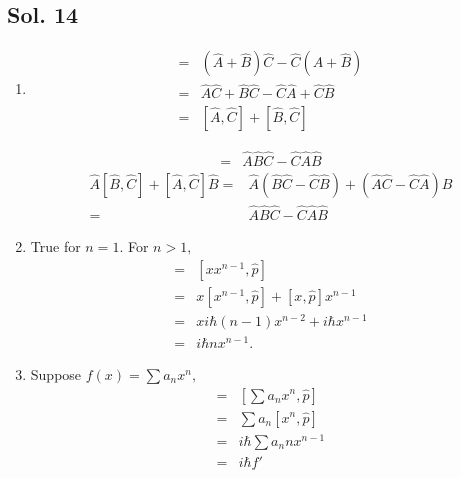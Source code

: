 \subsection*{Sol. 14}
\begin{enumerate}
    \item 
    \begin{align*}
        [\hat{A}+\hat{B}, \hat{C}]
        = &(\hat{A}+\hat{B})\hat{C}-\hat{C}(\hat{A}+\hat{B})\\
        =&\hat{A}\hat{C}+\hat{B}\hat{C}-\hat{C}\hat{A}+\hat{C}\hat{B}\\
        =&[\hat{A},\hat{C}]+[\hat{B},\hat{C}]
    \end{align*}

    \begin{align*}
        [\hat{A}\hat{B}, \hat{C}]
        = &\hat{A}\hat{B}\hat{C}-\hat{C}\hat{A}\hat{B}        
    \end{align*}
    \begin{align*}
        \hat{A}[\hat{B}, \hat{C}]
        +[\hat{A}, \hat{C}]\hat{B}
        = &\hat{A}(\hat{B}\hat{C}-\hat{C}\hat{B})+(\hat{A}\hat{C}-\hat{C}\hat{A})\hat{B}\\
        =&\hat{A}\hat{B}\hat{C}-\hat{C}\hat{A}\hat{B}        
    \end{align*}

    \item 
    True for $n=1.$ For $n>1,$
    \begin{align*}
        [x^n,\hat{p}]=&
        [xx^{n-1},\hat{p}]\\
        =&x[x^{n-1},\hat{p}]+
        [x,\hat{p}]x^{n-1}\\
        =&xi\hbar(n-1)x^{n-2}+
        i\hbar x^{n-1}\\
        =&i\hbar n x^{n-1}.
    \end{align*}
    \item 
    Suppose $f(x)=\sum a_n x^n,$
    \begin{align*}
        [f(x),\hat{p}] = &
        \left[\sum a_n x^n, \hat{p}\right]\\
        =&\sum a_n[x^n,\hat{p}]\\
        =&i\hbar \sum a_nnx^{n-1}\\
        =& i\hbar f'
    \end{align*}


\end{enumerate}

